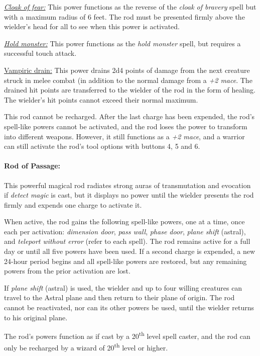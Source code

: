 \begin{multicols}{2}
\underline{\textit{Cloak of fear:}} This power functions as the reverse of the \textit{cloak of bravery} spell but with a maximum radius of 6 feet.  The rod must be presented firmly above the wielder's head for all to see when this power is activated.

\underline{\textit{Hold monster:}} This power functions as the \textit{hold monster} spell, but requires a successful touch attack.

\underline{Vampiric drain:} This power drains 2d4 points of damage from the next creature struck in melee combat (in addition to the normal damage from a \textit{+2 mace}.  The drained hit points are transferred to the wielder of the rod in the form of healing.  The wielder's hit points cannot exceed their normal maximum.

This rod cannot be recharged.  After the last charge has been expended, the rod's spell-like powers cannot be activated, and the rod loses the power to transform into different weapons.  However, it still functions as a \textit{+2 mace}, and a warrior can still activate the rod's tool options with buttons 4, 5 and 6.

\paragraph{Rod of Passage:} This powerful magical rod radiates strong auras of transmutation and evocation if \textit{detect magic} is cast, but it displays no power until the wielder presents the rod firmly and expends one charge to activate it.

When active, the rod gains the following spell-like powers, one at a time, once each per activation: \textit{dimension door}, \textit{pass wall}, \textit{phase door}, \textit{plane shift} (astral), and \textit{teleport without error} (refer to each spell).  The rod remains active for a full day or until all five powers have been used.  If a second charge is expended, a new 24-hour period begins and all spell-like powers are restored, but any remaining powers from the prior activation are lost.

If \textit{plane shift} (astral) is used, the wielder and up to four willing creatures can travel to the Astral plane and then return to their plane of origin.  The rod cannot be reactivated, nor can its other powers be used, until the wielder returns to his original plane.

The rod's powers function as if cast by a 20\textsuperscript{th} level spell caster, and the rod can only be recharged by a wizard of 20\textsuperscript{th} level or higher.


\end{multicols}
